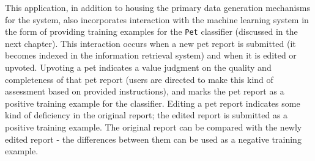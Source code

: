 This application, in addition to housing the primary data generation mechanisms for the system, also incorporates interaction with the machine learning system in the form of providing training examples for the {\tt Pet} classifier (discussed in the next chapter).  This interaction occurs when a new pet report is submitted (it becomes indexed in the information retrieval system) and when it is edited or upvoted.  Upvoting a pet indicates a value judgment on the quality and completeness of that pet report (users are directed to make this kind of assessment based on provided instructions), and marks the pet report as a positive training example for the classifier.  Editing a pet report indicates some kind of deficiency in the original report; the edited report is submitted as a positive training example.  The original report can be compared with the newly edited report - the differences between them can be used as a negative training example.

